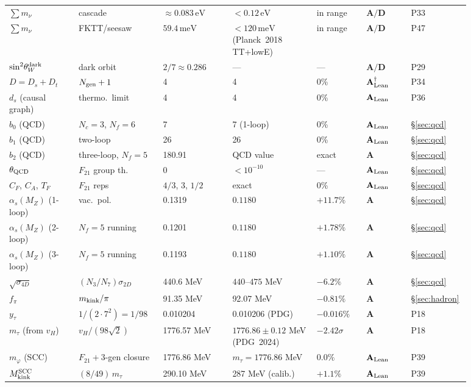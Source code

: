 \documentclass[11pt]{article}
\theoremstyle{remark}
\newcommand{\Ngen}{N_{\rm gen}}
\newcommand{\sinwsq}{\sin^2\!\theta_W}
\newcommand{\Ftwentyone}{F_{21}}
\newcommand{\CatA}{\textbf{A}}
\newcommand{\CatAL}{\ensuremath{\textbf{A}_{\rm Lean}}}
\newcommand{\CatAD}{\textbf{A/D}}
\begin{document}
\begin{appendices}
\begin{longtable}{@{}P{0.14\linewidth}P{0.17\linewidth}P{0.14\linewidth}P{0.17\linewidth}P{0.10\linewidth}P{0.09\linewidth}P{0.07\linewidth}@{}}
$\sum m_\nu$ & cascade & $\approx 0.083\,\text{eV}$ & $< 0.12\,\text{eV}$ & in range & $\CatAD$ & P33 \\
$\sum m_\nu$ & FKTT/seesaw & $59.4\,\text{meV}$ & $< 120\,\text{meV}$ (Planck~2018 TT+lowE) & in range & $\CatAD$ & P47 \\
$\sinwsq^{\rm dark}$ & dark orbit & $2/7 \approx 0.286$ & --- & --- & $\CatAD$ & P29 \\
$D = D_s + D_t$ & $\Ngen + 1$ & 4 & 4 & 0\% & $\CatAL^\dagger$ & P34 \\
$d_s$ (causal graph) & thermo.\ limit & 4 & 4 & 0\% & $\CatAL$ & P36 \\
$b_0$ (QCD) & $N_c=3$, $N_f=6$ & 7 & 7 (1-loop) & 0\% & $\CatAL$ & \S\ref{sec:qcd} \\
$b_1$ (QCD) & two-loop & 26 & 26 & 0\% & $\CatAL$ & \S\ref{sec:qcd} \\
$b_2$ (QCD) & three-loop, $N_f=5$ & 180.91 & QCD value & exact & $\CatA$ & \S\ref{sec:qcd} \\
$\theta_{\rm QCD}$ & $\Ftwentyone$ group th. & 0 & $< 10^{-10}$ & --- & $\CatAL$ & \S\ref{sec:qcd} \\
$C_F$, $C_A$, $T_F$ & $\Ftwentyone$ reps & $4/3$, 3, $1/2$ & exact & 0\% & $\CatAL$ & \S\ref{sec:qcd} \\
$\alpha_s(M_Z)$ (1-loop) & vac.\ pol. & 0.1319 & $0.1180$ & $+11.7\%$ & $\CatA$ & \S\ref{sec:qcd} \\
$\alpha_s(M_Z)$ (2-loop) & $N_f=5$ running & 0.1201 & $0.1180$ & $+1.78\%$ & $\CatA$ & \S\ref{sec:qcd} \\
$\alpha_s(M_Z)$ (3-loop) & $N_f=5$ running & 0.1193 & $0.1180$ & $+1.10\%$ & $\CatA$ & \S\ref{sec:qcd} \\
$\sqrt{\sigma_{4D}}$ & $(N_3/N_7)\sigma_{2D}$ & 440.6 MeV & $440$--$475$ MeV & $-6.2\%$ & $\CatA$ & \S\ref{sec:qcd} \\
$f_\pi$ & $m_{\rm kink}/\pi$ & 91.35 MeV & 92.07 MeV & $-0.81\%$ & $\CatA$ & \S\ref{sec:hadron} \\
$y_\tau$ & $1/(2 \cdot 7^2) = 1/98$ & 0.010204 & 0.010206 (PDG) & $-0.016\%$ & $\CatA$ & P18 \\
$m_\tau$ (from $v_H$) & $v_H/(98\sqrt{2})$ & 1776.57 MeV & $1776.86\pm0.12$ MeV (PDG~2024) & $-2.42\sigma$ & $\CatA$ & P18 \\
$m_\varphi$ (SCC) & $F_{21}\!+\!3$-gen closure & 1776.86 MeV & $m_\tau = 1776.86$ MeV & $0.0\%$ & $\CatAL$ & P39 \\
$M_{\rm kink}^{\rm SCC}$ & $(8/49)\,m_\tau$ & 290.10 MeV & 287 MeV (calib.) & $+1.1\%$ & $\CatAL$ & P39 \\

\end{longtable}
\end{appendices}
\end{document}
